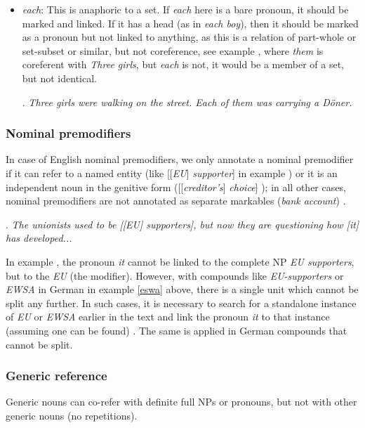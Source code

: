\documentclass[a4paper]{article}
\begin{document}
\begin{itemize}
\item {\sl each}: This is anaphoric to a set. If {\sl each} here is a bare pronoun, it should be marked and linked. If it has a head (as in {\sl each boy}), then it should be marked as a pronoun but not linked to anything, as this is a relation of part-whole or set-subset or similar, but not coreference, see example \Next, where {\sl them} is coreferent with {\sl Three girls}, but {\sl each} is not, it would be a member of a set, but not identical.

\ex.
{\sl Three girls were walking on the street. Each of them was carrying a D\"oner.}

\end{itemize}

\subsubsection{Nominal premodifiers}
In case of English nominal premodifiers, we only annotate a nominal premodifier if it can refer to a named entity (like [[{\sl EU}] {\sl supporter}] in example \Next) or it is an independent noun in the genitive form ([[{\sl creditor's}] {\sl choice}] ); in all other cases, nominal premodifiers are not annotated as separate markables ({\sl bank account}) \cite[p. 4]{GrishinaStedeGuide}.


\ex.
{\sl The unionists used to be [[EU] supporters], but now they are questioning how [it] has developed...}

In example \Last, the pronoun {\sl it} cannot be linked to the complete NP {\sl EU supporters}, but  to the {\sl EU} (the modifier). However, with compounds like {\sl EU-supporters} or {\sl EWSA} in German in example \ref{eswa} above, there is a single unit which cannot be split any further. In such cases, it is necessary to search for a standalone instance of {\sl EU} or {\sl EWSA} earlier in the text and link the pronoun {\sl it} to that instance (assuming one can be found) \cite[p. 7]{GuillouEtAlGuide}. The same is applied in German compounds that cannot be split.

\subsubsection{Generic reference}

Generic nouns can co-refer with definite full NPs or pronouns, but not with other generic nouns (no repetitions).
\end{document}
